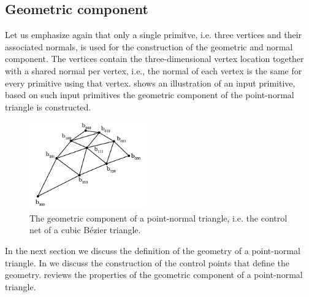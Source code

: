 
\subsection{Geometric component}
\label{ss:geometric_component}
	Let us emphasize again that only a single primitve, i.e. three vertices and their associated normals, is used for the construction of the geometric and normal component. The vertices contain the three-dimensional vertex location together with a shared normal per vertex, i.e., the normal of each vertex is the same for every primitive using that vertex.  shows an illustration of an input primitive, based on such input primitives the geometric component of the point-normal triangle is constructed.

	\begin{figure}
		\centering
		\includegraphics[width=0.45\textwidth]{./content/img/method/geometry_component.png}
		\caption{The geometric component of a point-normal triangle, i.e. the control net of a cubic Bézier triangle.}
		\label{fig:method:control_net}
	\end{figure}
	In the next section we discuss the definition of the geometry of a point-normal triangle. In  we discuss the construction of the control points that define the geometry.  reviews the properties of the geometric component of a point-normal triangle.

